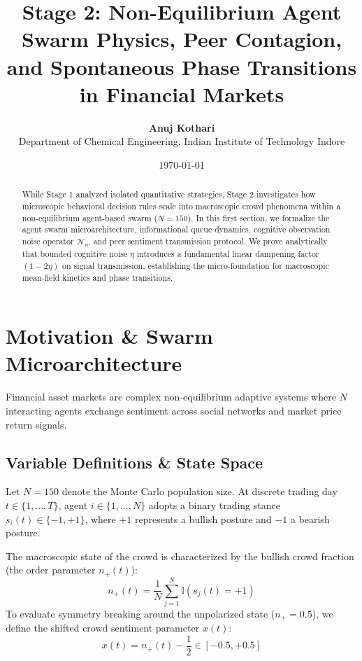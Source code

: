 \documentclass[11pt,a4paper]{article}
\title{\textbf{Stage 2: Non-Equilibrium Agent Swarm Physics, Peer Contagion, and Spontaneous Phase Transitions in Financial Markets}}
\author{\textbf{Anuj Kothari} \\ Department of Chemical Engineering, Indian Institute of Technology Indore}
\date{\today}
\begin{document}
\maketitle

\begin{abstract}
While Stage 1 analyzed isolated quantitative strategies, Stage 2 investigates how microscopic behavioral decision rules scale into macroscopic crowd phenomena within a non-equilibrium agent-based swarm ($N=150$). In this first section, we formalize the agent swarm microarchitecture, informational queue dynamics, cognitive observation noise operator $\mathcal{N}_\eta$, and peer sentiment transmission protocol. We prove analytically that bounded cognitive noise $\eta$ introduces a fundamental linear dampening factor $(1 - 2\eta)$ on signal transmission, establishing the micro-foundation for macroscopic mean-field kinetics and phase transitions.
\end{abstract}

\section{Motivation \& Swarm Microarchitecture}

Financial asset markets are complex non-equilibrium adaptive systems where $N$ interacting agents exchange sentiment across social networks and market price return signals. 

\subsection{Variable Definitions \& State Space}
Let $N = 150$ denote the Monte Carlo population size. At discrete trading day $t \in \{1, \dots, T\}$, agent $i \in \{1, \dots, N\}$ adopts a binary trading stance $s_i(t) \in \{-1, +1\}$, where $+1$ represents a bullish posture and $-1$ a bearish posture.

The macroscopic state of the crowd is characterized by the bullish crowd fraction (the order parameter $n_+(t)$):
\begin{equation}
    n_+(t) = \frac{1}{N} \sum_{j=1}^N \mathbb{I}(s_j(t) = +1)
\end{equation}
To evaluate symmetry breaking around the unpolarized state ($n_+ = 0.5$), we define the shifted crowd sentiment parameter $x(t)$:
\begin{equation}
    x(t) = n_+(t) - \frac{1}{2} \in [-0.5, +0.5]
\end{equation}
\end{document}
